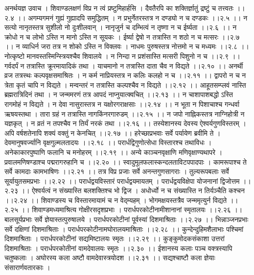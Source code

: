 \documentclass[11pt]{book}
\begin{document}
\begin{landscape}
अनर्थयज्ञ उवाच ।
शिवाण्डलक्षणं विप्र न त्वं प्रष्टुमिहार्हसि ।
दैवतैरपि का शक्तिर्ज्ञातुं द्रष्टुं च तत्त्वतः ।।२.४ ।।
अगम्यगमनं गुह्यं गुह्यादपि समुद्धितम् ।
न प्रभुर्नेतरस्तत्र न दण्ड्यो न च दण्डकः ।।२.५ ।।
न सत्यो नानृतस्तत्र सुशीलो नो दुःशीलवान् ।
नानृजुर्न च दम्भित्वं न तृष्णा न च ईर्ष्यता ।।२.६ ।।
न क्रोधो न च लोभो ऽस्ति न मानो ऽस्ति न सूयकः ।
ईर्ष्या द्वेषो न तत्रास्ति न शठो न च मत्सरः ।।२.७ ।।
न व्याधिर्न जरा तत्र न शोको ऽस्ति न विक्लवः ।
नाधमः पुरुषस्तत्र नोत्तमो न च मध्यमः ।।२.८ ।।
नोत्कृष्टो मानवस्तस्मिन्स्त्रियश्चैव शिवालये ।
न निन्दा न प्रशंसास्ति मत्सरी पिशुनो न च ।।२.९ ।।
गर्वदर्पं न तत्रास्ति क्रूरमायादिकं तथा ।
याचमानो न तत्रास्ति दाता चैव न विद्यते ।।२.१० ।।
अनर्थी व्रज तत्रस्थः कल्पवृक्षसमाश्रितः ।
न कर्म नाप्रियस्तत्र न कलिः कलहो न च ।।२.११ ।।
द्वापरो न च न त्रेता कृतं चापि न विद्यते ।
मन्वन्तरं न तत्रास्ति कल्पश्चैव न विद्यते ।।२.१२ ।।
आहूतसम्प्लवं नास्ति ब्रह्मरात्रिदिनं तथा ।
न जन्ममरणं तत्र आपदं नाप्नुयात्क्वचित् ।।२.१३ ।।
न चाशापाशबद्धो ऽस्ति रागमोहं न विद्यते ।
न देवा नासुरास्तत्र न यक्षोरगराक्षसाः ।।२.१४ ।।
न भूता न पिशाचाश्च गन्धर्वा ऋषयस्तथा ।
तारा ग्रहं न तत्रास्ति नागकिंनरगारुडम् ।।२.१५ ।।
न जपो नाह्निकस्तत्र नाग्निहोत्री न यज्ञकृत् ।
न व्रतं न तपश्चैव न तिर्यं नरकं तथा ।।२.१६ ।।
तस्येशानस्य देवस्य ऐश्वर्यगुणविस्तरम् ।
अपि वर्षशतेनापि शक्यं वक्तुं न केनचित् ।।२.१७ ।।
हरेच्छाप्रभवाः सर्वे पर्यायेण ब्रवीमि ते ।
देवमानुषवर्ज्यानि वृक्षगुल्मलतादयः ।।२.१८ ।।
परार्धद्विगुणोत्सेधा विस्तारश्च तथाविधः ।
अनेकाकारपुष्पाणि फलानि च मनोहरम् ।।२.१९ ।।
अन्ये काञ्चनवृक्षाणि मणिवृक्षाण्यथापरे ।
प्रवालमणिषण्डाश्च पद्मरागरुहानि च ।।२.२० ।।
स्वादुमूलफलास्कन्दलताविटपपादपाः ।
कामरूपाश्च ते सर्वे कामदाः कामभाषिणः ।।२.२१ ।।
तत्र विप्र प्रजाः सर्वे अनन्तगुणसागराः ।
तुल्यरूपबलाः सर्वे सूर्यायुतसमप्रभाः ।।२.२२ ।।
परार्धद्वयविस्तारं परार्धद्वयमायतम् ।
परार्धद्वयविक्षेपा योजनानां द्विजोत्तम ।।२.२३ ।।
ऐश्वर्यत्वं न संख्यास्ति बलशक्तिश्च भो द्विज ।
अधोर्ध्वो न च संख्यास्ति न तिर्यञ्चैति कश्चन ।।२.२४ ।।
शिवाण्डस्य च विस्तारमायामं च न वेद्म्यहम् ।
भोगमक्षयस्तत्रैव जन्ममृत्युर्न विद्यते ।।२.२५ ।।
शिवाण्डमध्यमाश्रित्य गोक्षीरसदृशप्रभाः ।
परार्धपरकोटीनामीशानानां स्मृतालयः ।।२.२६ ।।
बालसूर्यप्रभाः सर्वे ज्ञेयास्तत्पुरुषालये ।
परार्धपरकोटीनां पूर्वस्यां दिशमाश्रिताः ।।२.२७ ।।
भिन्नाञ्जनप्रभाः सर्वे दक्षिणां दिशमाश्रिताः ।
परार्धपरकोटीनामघोरालयमाश्रिताः ।।२.२८ ।।
कुन्देन्दुहिमशैलाभाः पश्चिमां दिशमाश्रिताः ।
परार्धपरकोटीनां सद्यमिष्टालयः स्मृतः ।।२.२९ ।।
कुङ्कुमोदकसंकाशा उत्तरां दिशमाश्रिताः ।
परार्धपरकोतीनां वामदेवालयः स्मृतः ।।२.३० ।।
ईशानस्य कलाः पञ्च वक्त्रस्यापि चतुष्कलाः ।
अघोरस्य कला अष्टौ वामदेवास्त्रयोदश ।।२.३१ ।।
सद्यश्चाष्टौ कला ज्ञेयाः संसारार्णवतारकाः ।

\end{landscape}
\end{document}
